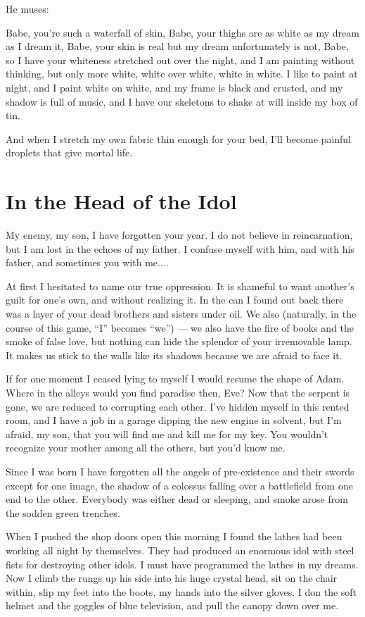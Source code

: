 \documentclass[english,11pt,letterpaper,onecolumn]{scrbook}
\begin{document}
He muses:

Babe, you're such a waterfall of skin, Babe, your thighs are as white as my dream as I dream it, Babe, your skin is real but my dream unfortunately is not, Babe, so I have your whiteness stretched out over the night, and I am painting without thinking, but only more white, white over white, white in white.  I like to paint at night, and I paint white on white, and my frame is black and crusted, and my shadow is full of music, and I have our skeletons to shake at will inside my box of tin.

And when I stretch my own fabric thin enough for your bed, I'll become painful droplets that give mortal life.

\newpage
\section{In the Head of the Idol}
	My enemy, my son, I have forgotten your year.  I do not believe in reincarnation, but I am lost in the echoes of my father.  I confuse myself with him, and with his father, and sometimes you with me....
	
	At first I hesitated to name our true oppression.  It is shameful to want another's guilt for one's own, and without realizing it.  In the can I found out back there was a layer of your dead brothers and sisters under oil.  We also (naturally, in the course of this game, ``I'' becomes ``we'') --- we also have the fire of books and the smoke of false love, but nothing can hide the splendor of your irremovable lamp.  It makes us stick to the walls like its shadows because we are afraid to face it.
	
	If for one moment I ceased lying to myself I would resume the shape of Adam.  Where in the alleys would you find paradise then, Eve?  Now that the serpent is gone, we are reduced to corrupting each other.  I've hidden myself in this rented room, and I have a job in a garage dipping the new engine in solvent, but I'm afraid, my son, that you will find me and kill me for my key.  You wouldn't recognize your mother among all the others, but you'd know me.

	Since I was born I have forgotten all the angels of pre-existence and their swords except for one image, the shadow of a colossus falling over a battlefield from one end to the other.  Everybody was either dead or sleeping, and smoke arose from the sodden green trenches.

	When I pushed the shop doors open this morning I found the lathes had been working all night by themselves.  They had produced an enormous idol with steel fists for destroying other idols.  I must have programmed the lathes in my dreams.  Now I climb the rungs up his side into his huge crystal head, sit on the chair within, slip my feet into the boots, my hands into the silver gloves.  I don the soft helmet and the goggles of blue television, and pull the canopy down over me.
\end{document}
